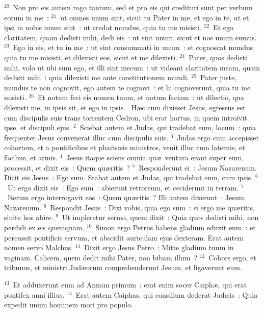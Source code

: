 ${}^{20}$~Non pro eis autem rogo tantum, sed et pro eis qui credituri sunt per verbum eorum in me~:
${}^{21}$~ut omnes unum sint, sicut tu Pater in me, et ego in te, ut et ipsi in nobis unum sint~: ut credat mundus, quia tu me misisti.
${}^{22}$~Et ego claritatem, quam dedisti mihi, dedi eis~: ut sint unum, sicut et nos unum sumus.
${}^{23}$~Ego in eis, et tu in me~: ut sint consummati in unum~: et cognoscat mundus quia tu me misisti, et dilexisti eos, sicut et me dilexisti.
${}^{24}$~Pater, quos dedisti mihi, volo ut ubi sum ego, et illi sint mecum~: ut videant claritatem meam, quam dedisti mihi~: quia dilexisti me ante constitutionem mundi.
${}^{25}$~Pater juste, mundus te non cognovit, ego autem te cognovi~: et hi cognoverunt, quia tu me misisti.
${}^{26}$~Et notum feci eis nomen tuum, et notum faciam~: ut dilectio, qua dilexisti me, in ipsis sit, et ego in ipsis.
~H\ae c cum dixisset Jesus, egressus est cum discipulis suis trans torrentem Cedron, ubi erat hortus, in quem introivit ipse, et discipuli ejus.
${}^{2}$~Sciebat autem et Judas, qui tradebat eum, locum~: quia frequenter Jesus convenerat illuc cum discipulis suis.
${}^{3}$~Judas ergo cum accepisset cohortem, et a pontificibus et pharis\ae is ministros, venit illuc cum laternis, et facibus, et armis.
${}^{4}$~Jesus itaque sciens omnia qu\ae\ ventura erant super eum, processit, et dixit eis~: Quem qu\ae ritis~?
${}^{5}$~Responderunt ei~: Jesum Nazarenum. Dicit eis Jesus~: Ego sum. Stabat autem et Judas, qui tradebat eum, cum ipsis.
${}^{6}$~Ut ergo dixit eis~: Ego sum~: abierunt retrorsum, et ceciderunt in terram.
${}^{7}$~Iterum ergo interrogavit eos~: Quem qu\ae ritis~? Illi autem dixerunt~: Jesum Nazarenum.
${}^{8}$~Respondit Jesus~: Dixi vobis, quia ego sum~: si ergo me qu\ae ritis, sinite hos abire.
${}^{9}$~Ut impleretur sermo, quem dixit~: Quia quos dedisti mihi, non perdidi ex eis quemquam.
${}^{10}$~Simon ergo Petrus habens gladium eduxit eum~: et percussit pontificis servum, et abscidit auriculam ejus dexteram. Erat autem nomen servo Malchus.
${}^{11}$~Dixit ergo Jesus Petro~: Mitte gladium tuum in vaginam. Calicem, quem dedit mihi Pater, non bibam illum~?
${}^{12}$~Cohors ergo, et tribunus, et ministri Jud\ae orum comprehenderunt Jesum, et ligaverunt eum.


${}^{13}$~Et adduxerunt eum ad Annam primum~: erat enim socer Caiph\ae , qui erat pontifex anni illius.
${}^{14}$~Erat autem Caiphas, qui consilium dederat Jud\ae is~: Quia expedit unum hominem mori pro populo.


